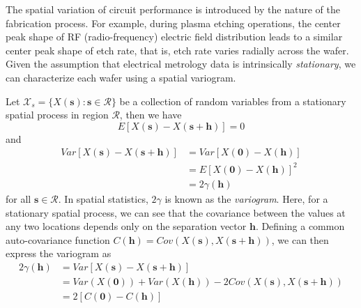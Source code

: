 \documentclass[english]{article}
\numberwithin{equation}{section}
\numberwithin{table}{section}
\numberwithin{figure}{section}
\newcommand{\bms}{\bm{s}}
\newcommand{\bmh}{\bm{h}}
\begin{document}
\hspace{12 pt}
The spatial variation of circuit performance is introduced by the
nature of the fabrication process. For example, during plasma etching
operations, the center peak shape of RF (radio-frequency) electric
field distribution leads to a similar center peak shape of etch rate,
that is, etch rate varies radially across the wafer\cite{dkPHD}. Given
the assumption that electrical metrology data is intrinsically
\emph{stationary}, we can characterize each wafer using a spatial
variogram.


Let $\mathcal{X}_s = \{ X(\bms) : \bms \in \mathcal{R} \}$ be a
collection of random variables from a stationary spatial process in
region $\mathcal{R}$, then we have
\begin{equation} \label{ssmean}
  E[X(\bms) - X(\bms + \bmh)] = 0
\end{equation}
and
\begin{equation} \label{ssvar}
\begin{split}
  Var[X(\bms) - X(\bms + \bmh)] &= Var[X(\bm{0}) - X(\bmh)] \\
  &= E[X(\bm{0}) - X(\bmh)]^2 \\
  &= 2\gamma(\bmh)
\end{split}
\end{equation}
for all $\bms \in \mathcal{R}$. In spatial statistics, $2\gamma$ is
known as the \emph{variogram}. Here, for a stationary spatial process,
we can see that the covariance between the values at any two locations 
depends only on the separation vector $\bmh$. Defining a common
auto-covariance function $C(\bmh) = Cov(X(\bms), X(\bms +
\bmh))$, we can then express the variogram as
\begin{equation} \label{variodef}
\begin{split}
  2\gamma(\bmh) &= Var[X(\bms) - X(\bms + \bmh)] \\
  &= Var(X(\bm{0})) + Var(X(\bmh)) - 2Cov(X(\bms), X(\bms + \bmh)) \\
  &= 2[C(\bm{0}) - C(\bmh)]
\end{split}
\end{equation}
\end{document}
